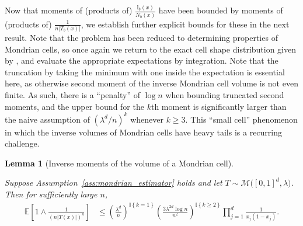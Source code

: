 \documentclass[11pt,lof]{puthesis}
\newcommand{\E}{\ensuremath{\mathbb{E}}}
\newcommand{\I}{\ensuremath{\mathbb{I}}}
\newcommand{\cM}{\ensuremath{\mathcal{M}}}
\theoremstyle{break}
\newtheorem{lemma}{Lemma}[section]
\theoremstyle{proof}
\begin{document}
Now that moments of (products of) $\frac{\I_b(x)}{N_b(x)}$
have been bounded by moments of
(products of) $\frac{1}{n |T_b(x)|}$, we establish further
explicit bounds for these in the next result.
Note that the problem has been reduced to determining
properties of Mondrian cells, so once again we return to the
exact cell shape distribution given by \citet{mourtada2020minimax},
and evaluate the appropriate expectations by integration.
Note that the truncation by taking the minimum with one inside the expectation
is essential here, as otherwise second moment of the inverse Mondrian cell
volume is not even finite. As such, there is a ``penalty'' of $\log n$
when bounding truncated second moments,
and the upper bound for the $k$th moment is significantly
larger than the naive assumption of $(\lambda^d / n)^k$
whenever $k \geq 3$.
This ``small cell'' phenomenon in which the inverse volumes of Mondrian cells
have heavy tails is a recurring challenge.

\begin{lemma}[Inverse moments of the volume of a Mondrian cell]%
  \label{lem:mondrian_app_moment_cell}

  Suppose Assumption~\ref{ass:mondrian_estimator} holds
  and let $T \sim \cM\big([0,1]^d, \lambda\big)$.
  Then for sufficiently large $n$,
  \begin{align*}
    \E\left[
      1 \wedge
      \frac{1}{(n |T(x)|)^k}
    \right]
    &\leq
    \left(
      \frac{\lambda^d}{n}
    \right)^{\I \left\{ k = 1 \right\}}
    \left(
      \frac{3 \lambda^{2d} \log n}{n^2}
    \right)^{\I \left\{ k \geq 2 \right\}}
    \prod_{j=1}^{d} \frac{1}{x_j (1-x_j)}.
  \end{align*}
\end{lemma}
\end{document}
